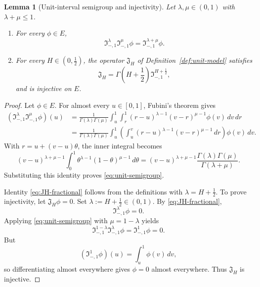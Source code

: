 \documentclass[11pt,a4paper]{amsart}
\theoremstyle{plain}
\newtheorem{lemma}[theorem]{Lemma}
\theoremstyle{definition}
\theoremstyle{remark}
\begin{document}
\begin{lemma}[Unit-interval semigroup and injectivity]\label{lem:unit-semigroup}
Let $\lambda,\mu\in(0,1)$ with $\lambda+\mu\le 1$.
\begin{enumerate}[label=(\roman*)]
\item For every $\phi\in E$,
\begin{equation}\label{eq:unit-semigroup}
\mathfrak I_{-,1}^\lambda \mathfrak I_{-,1}^\mu \phi
=
\mathfrak I_{-,1}^{\lambda+\mu}\phi.
\end{equation}
\item For every $H\in(0,\tfrac12)$, the operator $\mathfrak J_H$ of
Definition~\ref{def:unit-model} satisfies
\begin{equation}\label{eq:JH-fractional}
\mathfrak J_H
=
\Gamma\!\left(H+\frac12\right)\mathfrak I_{-,1}^{H+\frac12},
\end{equation}
and is injective on $E$.
\end{enumerate}
\end{lemma}

\begin{proof}
Let $\phi\in E$. For almost every $u\in[0,1]$, Fubini's theorem gives
\begin{align*}
(\mathfrak I_{-,1}^\lambda \mathfrak I_{-,1}^\mu \phi)(u)
&=
\frac{1}{\Gamma(\lambda)\Gamma(\mu)}
\int_u^1\int_r^1
(r-u)^{\lambda-1}(v-r)^{\mu-1}\phi(v)\,dv\,dr \\
&=
\frac{1}{\Gamma(\lambda)\Gamma(\mu)}
\int_u^1
\left(
\int_u^v (r-u)^{\lambda-1}(v-r)^{\mu-1}\,dr
\right)\phi(v)\,dv.
\end{align*}
With $r=u+(v-u)\theta$, the inner integral becomes
\[
(v-u)^{\lambda+\mu-1}
\int_0^1 \theta^{\lambda-1}(1-\theta)^{\mu-1}\,d\theta
=
(v-u)^{\lambda+\mu-1}
\frac{\Gamma(\lambda)\Gamma(\mu)}{\Gamma(\lambda+\mu)}.
\]
Substituting this identity proves \eqref{eq:unit-semigroup}.

Identity \eqref{eq:JH-fractional} follows from the definitions with
$\lambda=H+\tfrac12$. To prove injectivity, let $\mathfrak J_H\phi=0$. Set
$\lambda:=H+\tfrac12\in(0,1)$. By \eqref{eq:JH-fractional},
\[
\mathfrak I_{-,1}^\lambda \phi=0.
\]
Applying \eqref{eq:unit-semigroup} with $\mu=1-\lambda$ yields
\[
\mathfrak I_{-,1}^{1-\lambda}\mathfrak I_{-,1}^\lambda \phi
=
\mathfrak I_{-,1}^1\phi
=
0.
\]
But
\[
(\mathfrak I_{-,1}^1\phi)(u)=\int_u^1 \phi(v)\,dv,
\]
so differentiating almost everywhere gives $\phi=0$ almost everywhere. Thus $\mathfrak J_H$
is injective.
\end{proof}
\end{document}
